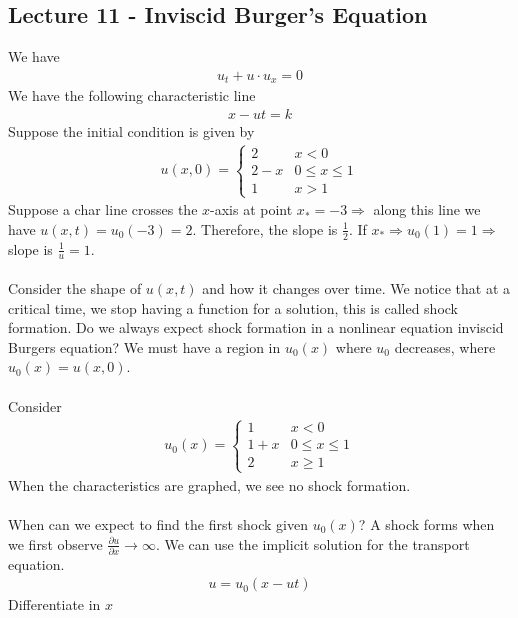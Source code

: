 \documentclass[12pt, letterpaper]{article}
\begin{document}
\subsection{Lecture 11 - Inviscid Burger's Equation}
We have 
\begin{align*}
    u_t + u\cdot u_x = 0
\end{align*}
We have the following characteristic line
\begin{align*}
    x - ut = k
\end{align*}
Suppose the initial condition is given by 
\begin{align*}
    u(x,0) = \begin{cases}
        2 & x < 0 \\
        2-x & 0 \le x \le 1 \\
        1 & x > 1
    \end{cases}
\end{align*}
Suppose a char line crosses the $x$-axis at point $x_\ast = -3 \Rightarrow$ along this line we 
have $u(x,t) = u_0(-3) = 2$. Therefore, the slope is $\frac{1}{2}$. If 
$x_\ast \Rightarrow u_0(1) = 1 \Rightarrow$ slope is $\frac{1}{u} = 1$. \\ \\
Consider the shape of $u(x,t)$ and how it changes over time. We notice that at a critical time, 
we stop having a function for a solution, this is called shock formation. Do we always expect
shock formation in a nonlinear equation inviscid Burgers equation? We must have a region in 
$u_0(x)$ where $u_0$ decreases, where $u_0(x) = u(x,0)$. \\ \\
 Consider 
\begin{align*}
    u_0(x) = \begin{cases}
        1 & x < 0 \\
        1+x & 0 \le x \le 1 \\
        2 & x \ge 1
    \end{cases}
\end{align*}
When the characteristics are graphed, we see no shock formation. \\ \\ 
When can we expect to find the first shock given $u_0(x)$? A shock forms when we first observe
$\frac{\partial u}{\partial x} \rightarrow \infty$. We can use the implicit solution for the 
transport equation.
\begin{align*}
    u = u_0(x-ut)
\end{align*}
Differentiate in $x$
\end{document}
